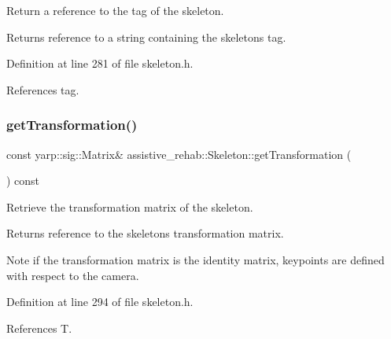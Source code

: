 Return a reference to the tag of the skeleton. 

\begin{DoxyReturn}{Returns}
reference to a string containing the skeleton\textquotesingle{}s tag. 
\end{DoxyReturn}


Definition at line 281 of file skeleton.\+h.


\begin{DoxyCode}{0}

\end{DoxyCode}


References tag.

\mbox{\label{classassistive__rehab_1_1Skeleton_a2bdcc0d686a5a232aa2c07528cf2e647}} 
\subsubsection{\texorpdfstring{getTransformation()}{getTransformation()}}
{\footnotesize\ttfamily const yarp\+::sig\+::\+Matrix\& assistive\+\_\+rehab\+::\+Skeleton\+::get\+Transformation (\begin{DoxyParamCaption}{ }\end{DoxyParamCaption}) const\hspace{0.3cm}{\ttfamily [inline]}}



Retrieve the transformation matrix of the skeleton. 

\begin{DoxyReturn}{Returns}
reference to the skeleton\textquotesingle{}s transformation matrix. 
\end{DoxyReturn}
\begin{DoxyNote}{Note}
if the transformation matrix is the identity matrix, keypoints are defined with respect to the camera. 
\end{DoxyNote}


Definition at line 294 of file skeleton.\+h.


\begin{DoxyCode}{0}

\end{DoxyCode}


References T.

